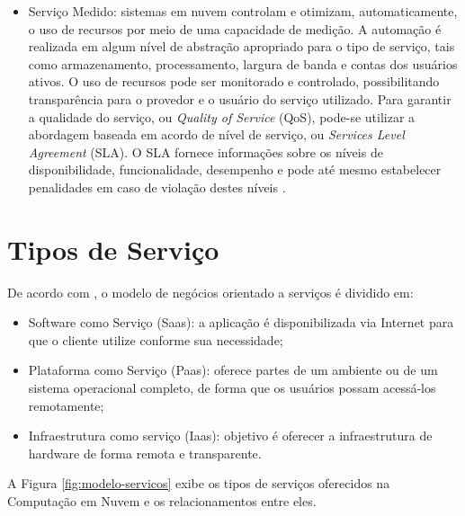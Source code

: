\begin{itemize}
  \item Serviço Medido: sistemas em nuvem controlam e otimizam, automaticamente, o uso de recursos por meio de uma capacidade de medição. A automação é realizada em algum nível de abstração apropriado para o tipo de serviço, tais como armazenamento, processamento, largura de banda e contas dos usuários ativos. O uso de recursos pode ser monitorado e controlado, possibilitando transparência para o provedor e o usuário do serviço utilizado. Para garantir a qualidade do serviço, ou \textit{Quality of Service} (QoS), pode-se utilizar a abordagem baseada em acordo de nível de serviço, ou \textit{Services Level Agreement} (SLA). O SLA fornece informações sobre os níveis de disponibilidade, funcionalidade, desempenho e pode até mesmo estabelecer penalidades em caso de violação destes níveis \cite{ERCEMAPI2009}.
  
\end{itemize}

\section{Tipos de Serviço}
De acordo com \cite{JISA2010}, o modelo de negócios orientado a serviços é dividido em:

\begin{itemize}
  \item Software como Serviço (Saas): a aplicação é disponibilizada via Internet para que o cliente utilize conforme sua necessidade;
  \item Plataforma como Serviço (Paas): oferece partes de um ambiente ou de um sistema operacional completo, de forma que os usuários possam acessá-los remotamente;
  \item Infraestrutura como serviço (Iaas): objetivo é oferecer a infraestrutura de hardware de forma remota e transparente.
\end{itemize}

A Figura \ref{fig:modelo-servicos} exibe os tipos de serviços oferecidos na Computação em Nuvem e os relacionamentos entre eles.

